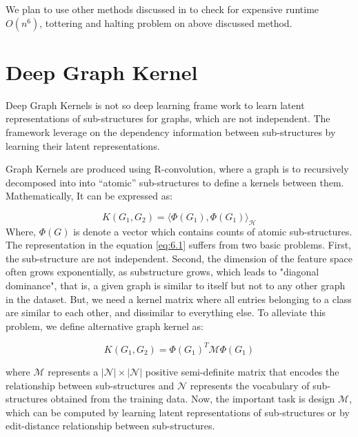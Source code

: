 \documentclass[12pt,a4paper]{article}
\numberwithin{equation}{section}
\numberwithin{figure}{section}
\numberwithin{table}{section}
\begin{document}
We plan to use other methods discussed in \citet{Vishwanathan2010} to check for expensive runtime $O(n^{6})$, tottering and halting \citep{Borgwardt2005} problem on above discussed method.

\section{Deep Graph Kernel}

Deep Graph Kernels \citep{Yanardag2015} is not so deep learning frame work to learn latent representations of sub-structures for graphs, which are not independent. The framework leverage on the dependency information between sub-structures by learning their latent representations. 

Graph Kernels are produced using R-convolution, where a graph is to recursively decomposed into into “atomic” sub-structures to define a kernels between them.  Mathematically, It can be expressed as:

%
\begin{equation}\label{eq:6.1}
K(G_{1}, G_{2}) = {\Bigg \langle \Phi(G_{1}), \Phi(G_{1}) \Bigg \rangle}_{\mathcal{H}}
\end{equation}
%
Where, $\Phi(G)$ is denote a vector which contains counts of atomic sub-structures. The representation in the equation \ref{eq:6.1} suffers from two basic problems. First, the sub-structure are not independent. Second, the dimension of the feature space often grows exponentially, as substructure grows, which leads to "diagonal dominance", that is, a given graph is similar to itself but not to any other graph in the dataset. But, we need a kernel matrix where all entries belonging to a class
are similar to each other, and dissimilar to everything else. To alleviate this problem, we define alternative graph kernel as:

%
\begin{equation}\label{eq:6.1}
K(G_{1}, G_{2}) = \Phi(G_{1})^{T} \mathcal{M} \Phi(G_{1})
\end{equation}
%
 
where $\mathcal{M}$ represents a $|\mathcal{N}|\times |\mathcal{N}|$ positive semi-definite matrix that encodes the relationship between sub-structures and $\mathcal{N}$ represents the vocabulary of sub-structures obtained from the training data. Now, the important task is design $\mathcal{M}$, which can be computed by learning latent representations of sub-structures or by edit-distance relationship between sub-structures. 
\end{document}

